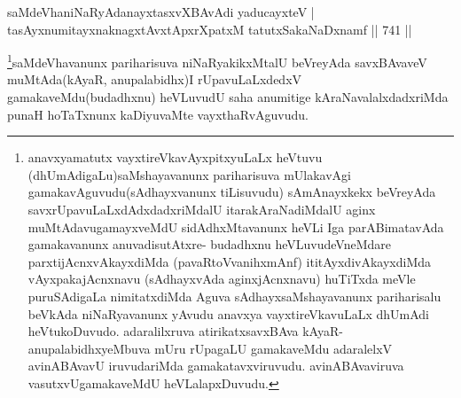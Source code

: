 
\begin{shl}
saMdeVhaniNaRyAdanayxtasxvXBAvAdi yaducayxteV | \\
tasAyxnumitayxnaknagxtAvxtApxrXpatxM tatutxSakaNaDxnamf \hfill||  741 ||  
\end{shl}

\begin{artha}
\footnote{anavxyamatutx vayxtireVkavAyxpitxyuLaLx heVtuvu (dhUmAdigaLu)saMshayavanunx pariharisuva mUlakavAgi gamakavAguvudu(sAdhayxvanunx tiLisuvudu) sAmAnayxkekx beVreyAda savxrUpavuLaLxdAdxdadxriMdalU itarakAraNadiMdalU aginx muMtAdavugamayxveMdU sidAdhxMtavanunx heVLi Iga parABimatavAda gamakavanunx anuvadisutAtxre- budadhxnu heVLuvudeVneMdare parxtijAcnxvAkayxdiMda (pavaRtoVvanihxmAnf) ititAyxdivAkayxdiMda vAyxpakajAcnxnavu (sAdhayxvAda aginxjAcnxnavu) huTiTxda meVle puruSAdigaLa nimitatxdiMda Aguva sAdhayxsaMshayavanunx pariharisalu beVkAda niNaRyavanunx yAvudu anavxya vayxtireVkavuLaLx dhUmAdi heVtukoDuvudo. adaralilxruva atirikatxsavxBAva kAyaR- anupalabidhxyeMbuva mUru rUpagaLU gamakaveMdu adaralelxV avinABAvavU iruvudariMda gamakatavxviruvudu. avinABAvaviruva vasutxvUgamakaveMdU heVLalapxDuvudu.}saMdeVhavanunx pariharisuva niNaRyakikxMtalU beVreyAda savxBAvaveV  muMtAda(kAyaR, anupalabidhx)I rUpavuLaLxdedxV gamakaveMdu(budadhxnu) heVLuvudU saha anumitige kAraNavalalxdadxriMda punaH hoTaTxnunx kaDiyuvaMte vayxthaRvAguvudu.
\end{artha}


